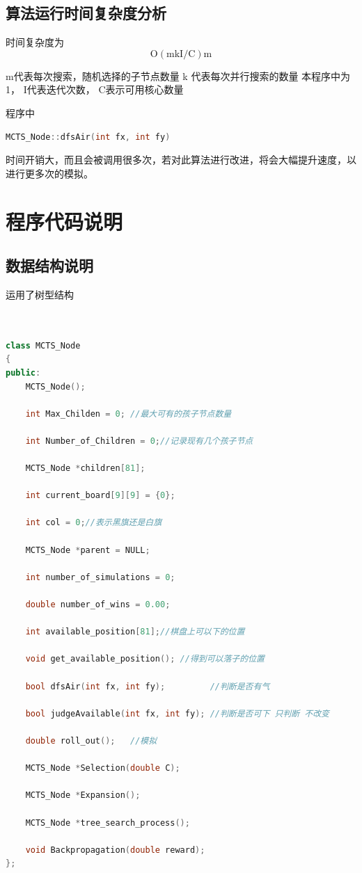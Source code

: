 \documentclass{ctexrep}
\begin{document}
\section{算法运行时间复杂度分析}
时间复杂度为
\begin{equation}\label{eq:eq1}
\mathrm{O}(\mathrm{mkI} / \mathrm{C}) \mathrm{m}\end{equation}


m代表每次搜索，随机选择的子节点数量
k 代表每次并行搜索的数量 本程序中为1，
I代表迭代次数，
C表示可用核心数量
		


程序中
\begin{lstlisting}[language=C++]
    MCTS_Node::dfsAir(int fx, int fy)
\end{lstlisting}

时间开销大，而且会被调用很多次，若对此算法进行改进，将会大幅提升速度，以进行更多次的模拟。

\chapter{程序代码说明}


\section{数据结构说明}
运用了树型结构
\begin{lstlisting}[language=C++]
   

class MCTS_Node
{
public:
    MCTS_Node();
    
    int Max_Childen = 0; //最大可有的孩子节点数量
    
    int Number_of_Children = 0;//记录现有几个孩子节点
    
    MCTS_Node *children[81];

    int current_board[9][9] = {0};

    int col = 0;//表示黑旗还是白旗
    
    MCTS_Node *parent = NULL;
   
    int number_of_simulations = 0;
    
    double number_of_wins = 0.00;
    
    int available_position[81];//棋盘上可以下的位置
    
    void get_available_position(); //得到可以落子的位置
    
    bool dfsAir(int fx, int fy);         //判断是否有气
    
    bool judgeAvailable(int fx, int fy); //判断是否可下 只判断 不改变
    
    double roll_out();   //模拟
    
    MCTS_Node *Selection(double C);  
    
    MCTS_Node *Expansion();
    
    MCTS_Node *tree_search_process();
    
    void Backpropagation(double reward);
};


\end{lstlisting}
\end{document}
